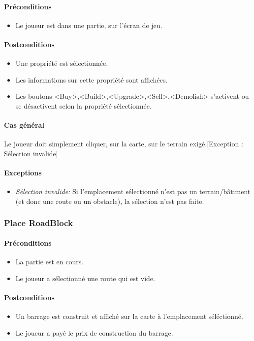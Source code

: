 \documentclass[a4paper,11pt]{report}
\begin{document}
\paragraph{Préconditions}
\begin{itemize}
	\item Le joueur est dans une partie, sur l'écran de jeu.
\end{itemize}
\paragraph{Postconditions}
\begin{itemize}
	\item Une propriété est sélectionnée.
	\item Les informations sur cette propriété sont affichées.
	\item Les boutons <Buy>,<Build>,<Upgrade>,<Sell>,<Demolish> s'activent ou se désactivent selon la propriété sélectionnée.
\end{itemize}
\paragraph{Cas général}
Le joueur doit simplement cliquer, sur la carte, sur le terrain exigé.[Exception : Sélection invalide]
\paragraph{Exceptions}
\begin{itemize}
	\item \textit{Sélection invalide:} Si l'emplacement sélectionné n'est pas un terrain/bâtiment (et donc une route ou un obstacle), la sélection n'est pas faite.
\end{itemize}

\subsubsection{Place RoadBlock}
\paragraph{Préconditions}
\begin{itemize}
	\item La partie est en cours.
	\item Le joueur a sélectionné une route qui est vide.
\end{itemize}
\paragraph{Postconditions}
\begin{itemize}
	\item Un barrage est construit et affiché sur la carte à l'emplacement séléctionné.
	\item Le joueur a payé le prix de construction du barrage.
\end{itemize}
\end{document}
